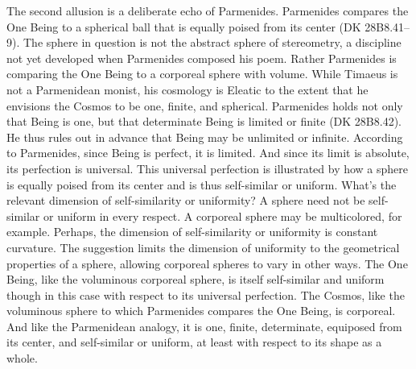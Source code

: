 The second allusion is a deliberate echo of Parmenides. Parmenides compares the One Being to a spherical ball that is equally poised from its center (DK 28B8.41--9). The sphere in question is not the abstract sphere of stereometry, a discipline not yet developed when Parmenides composed his poem. Rather Parmenides is comparing the One Being to a corporeal sphere with volume. While Timaeus is not a Parmenidean monist, his cosmology is Eleatic to the extent that he envisions the Cosmos to be one, finite, and spherical. Parmenides holds not only that Being is one, but that determinate Being is limited or finite (DK 28B8.42). He thus rules out in advance that Being may be unlimited or infinite. According to Parmenides, since Being is perfect, it is limited. And since its limit is absolute, its perfection is universal. This universal perfection is illustrated by how a sphere is equally poised from its center and is thus self-similar or uniform. What's the relevant dimension of self-similarity or uniformity? A sphere need not be self-similar or uniform in every respect. A corporeal sphere may be multicolored, for example. Perhaps, the dimension of self-similarity or uniformity is constant curvature. The suggestion limits the dimension of uniformity to the geometrical properties of a sphere, allowing corporeal spheres to vary in other ways.  The One Being, like the voluminous corporeal sphere, is itself self-similar and uniform though in this case with respect to its universal perfection. The Cosmos, like the voluminous sphere to which Parmenides compares the One Being, is corporeal. And like the Parmenidean analogy, it is one, finite, determinate, equiposed from its center, and self-similar or uniform, at least with respect to its shape as a whole.

